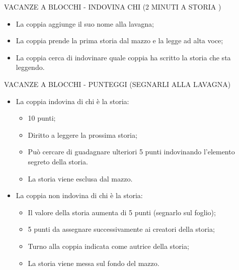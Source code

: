 \documentclass[aspectratio=1610]{beamer}
\begin{document}
\begin{frame}{VACANZE A BLOCCHI - INDOVINA CHI (2 MINUTI A STORIA )}
    \begin{itemize}
        \item La coppia aggiunge il suo nome alla lavagna;
        \pause
        \item La coppia prende la prima storia dal mazzo e la legge ad alta voce;
        \pause
        \item La coppia cerca di indovinare quale coppia ha scritto la storia che sta leggendo.
    \end{itemize}
\end{frame}

\begin{frame}{VACANZE A BLOCCHI - PUNTEGGI (SEGNARLI ALLA LAVAGNA)}
    \begin{itemize}
        \item La coppia indovina di chi è la storia:
        \begin{itemize}
            \item 10 punti;
            \item Diritto a leggere la prossima storia;
            \item Può cercare di guadagnare ulteriori 5 punti indovinando l'elemento segreto della storia.
            \item La storia viene esclusa dal mazzo.
        \end{itemize}
        \item La coppia non indovina di chi è la storia: 
        \begin{itemize}
            \item Il valore della storia aumenta di 5 punti (segnarlo sul foglio);
            \item 5 punti da assegnare successivamente ai creatori della storia;
            \item Turno alla coppia indicata come autrice della storia;
            \item La storia viene messa sul fondo del mazzo.
        \end{itemize}
    \end{itemize}
\end{frame}
\end{document}
